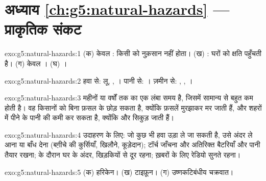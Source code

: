 \section*{अध्याय \ref{ch:g5:natural-hazards} --- प्राकृतिक संकट}

\begin{solution}{exo:g5:natural-hazards:1}
(क) केवल : किसी को नुक़सान नहीं होता। (ख) : घरों को
क्षति पहुँचती है। (ग) केवल । (घ) ।
\end{solution}

\begin{solution}{exo:g5:natural-hazards:2}
हवा से: लू, , । पानी से: । ज़मीन से: ,  ,
।
\end{solution}

\begin{solution}{exo:g5:natural-hazards:3}
 महीनों या वर्षों तक का एक लंबा समय है, जिसमें सामान्य से बहुत कम  होती
है। वह किसानों को बिना फ़सल के छोड़ सकता है, क्योंकि फ़सलें मुरझाकर मर जाती हैं, और
शहरों में पीने के पानी की कमी कर सकता है, क्योंकि  और 
सिकुड़ जाती हैं।
\end{solution}

\begin{solution}{exo:g5:natural-hazards:4}
उदाहरण के लिए: जो कुछ भी हवा उड़ा ले जा सकती है, उसे अंदर ले आना या बाँध देना
(बग़ीचे की कुर्सियाँ, खिलौने, कूड़ेदान); टॉर्च जाँचना और अतिरिक्त बैटरियाँ और पानी
तैयार रखना;  के दौरान घर के अंदर, खिड़कियों से दूर रहना; ख़बरों के लिए रेडियो
सुनते रहना।
\end{solution}

\begin{solution}{exo:g5:natural-hazards:5}
(क) हरिकेन। (ख) टाइफ़ून। (ग) उष्णकटिबंधीय चक्रवात।
\end{solution}

